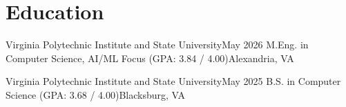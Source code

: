 \section{Education}
\resumeSubHeadingListStart

\resumeSubheading
{Virginia Polytechnic Institute and State University}{May 2026}
{M.Eng. in Computer Science, AI/ML Focus (GPA: 3.84 / 4.00)}{Alexandria, VA}

\resumeSubheading
{Virginia Polytechnic Institute and State University}{May 2025}
{B.S. in Computer Science (GPA: 3.68 / 4.00)}{Blacksburg, VA}

\resumeSubHeadingListEnd